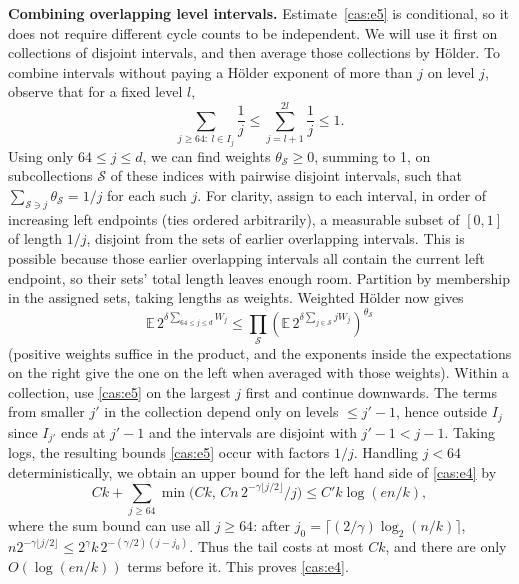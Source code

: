 \medskip\noindent\textbf{Combining overlapping level intervals.}\enspace
Estimate~\eqref{cas:e5} is conditional, so it does not require different
cycle counts to be independent.  We will use it first on collections of
disjoint intervals, and then average those collections by H\"older.
To combine intervals without paying a H\"older exponent of more than \(j\) on level \(j\), observe that for a fixed level \(l\),
\[
\sum_{j\ge 64:\ l\in I_j} \frac1j
\le \sum_{j=l+1}^{2l} \frac1j \le 1 .
\]
Using only \(64\le j\le d\), we can find weights \(\theta_{\mathcal S}\ge 0\), summing to 1, on subcollections \(\mathcal S\) of these indices with pairwise disjoint intervals, such that \(\sum_{\mathcal S\ni j}\theta_{\mathcal S}=1/j\) for each such \(j\). For clarity, assign to each interval, in order of increasing left endpoints (ties ordered arbitrarily), a measurable subset of \([0,1]\) of length \(1/j\), disjoint from the sets of earlier overlapping intervals. This is possible because those earlier overlapping intervals all contain the current left endpoint, so their sets' total length leaves enough room. Partition by membership in the assigned sets, taking lengths as weights. Weighted Hölder now gives
\[
\mathbb E\,2^{\delta\sum_{64\le j\le d} W_j}
\le \prod_{\mathcal S}\left(\mathbb E\,2^{\delta\sum_{j\in\mathcal S} j W_j}\right)^{\theta_{\mathcal S}}
\]
(positive weights suffice in the product, and the exponents inside the expectations on the right give the one on the left when averaged with those weights). Within a collection, use \eqref{cas:e5} on the largest \(j\) first and continue downwards. The terms from smaller \(j'\) in the collection depend only on levels \(\le j'-1\), hence outside \(I_j\) since \(I_{j'}\) ends at \(j'-1\) and the intervals are disjoint with \(j'-1<j-1\). Taking logs, the resulting bounds \eqref{cas:e5} occur with factors \(1/j\). Handling \(j<64\) deterministically, we obtain an upper bound for the left hand side of \eqref{cas:e4} by
\[
C k + \sum_{j\ge64} \min\big(Ck,\, Cn\,2^{-\gamma\lfloor j/2\rfloor}/j\big)
\le C' k\log(e n/k),
\]
where the sum bound can use all \(j\ge 64\): after \(j_0=\lceil (2/\gamma)\log_2(n/k)\rceil\), \(n2^{-\gamma\lfloor j/2\rfloor}\le 2^\gamma k\, 2^{-(\gamma/2)(j-j_0)}\). Thus the tail costs at most \(Ck\), and there are only \(O(\log(e n/k))\) terms before it. This proves \eqref{cas:e4}.


